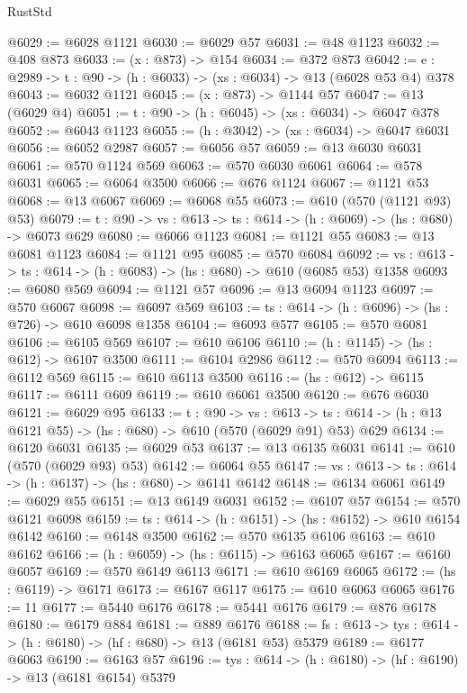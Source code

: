 \begin{lexlean}{RustStd}
\begin{coremodule}
@6029 := @6028 @1121
@6030 := @6029 @57
@6031 := @48 @1123
@6032 := @408 @873
@6033 := (x : @873) -> @154
@6034 := @372 @873
@6042 := {e : @2989} -> {t : @90} -> (h : @6033) -> (xs : @6034) -> @13 (@6028 @53 @4) @378
@6043 := @6032 @1121
@6045 := (x : @873) -> @1144 @57
@6047 := @13 (@6029 @4)
@6051 := {t : @90} -> (h : @6045) -> (xs : @6034) -> @6047 @378
@6052 := @6043 @1123
@6055 := (h : @3042) -> (xs : @6034) -> @6047 @6031
@6056 := @6052 @2987
@6057 := @6056 @57
@6059 := @13 @6030 @6031
@6061 := @570 @1124 @569
@6063 := @570 @6030 @6061
@6064 := @578 @6031
@6065 := @6064 @3500
@6066 := @676 @1124
@6067 := @1121 @53
@6068 := @13 @6067
@6069 := @6068 @55
@6073 := @610 (@570 (@1121 @93) @53)
@6079 := {t : @90} -> {vs : @613} -> {ts : @614} -> (h : @6069) -> (hs : @680) -> @6073 @629
@6080 := @6066 @1123
@6081 := @1121 @55
@6083 := @13 @6081 @1123
@6084 := @1121 @95
@6085 := @570 @6084
@6092 := {vs : @613} -> {ts : @614} -> (h : @6083) -> (hs : @680) -> @610 (@6085 @53) @1358
@6093 := @6080 @569
@6094 := @1121 @57
@6096 := @13 @6094 @1123
@6097 := @570 @6067
@6098 := @6097 @569
@6103 := {ts : @614} -> (h : @6096) -> (hs : @726) -> @610 @6098 @1358
@6104 := @6093 @577
@6105 := @570 @6081
@6106 := @6105 @569
@6107 := @610 @6106
@6110 := (h : @1145) -> (hs : @612) -> @6107 @3500
@6111 := @6104 @2986
@6112 := @570 @6094
@6113 := @6112 @569
@6115 := @610 @6113 @3500
@6116 := (hs : @612) -> @6115
@6117 := @6111 @609
@6119 := @610 @6061 @3500
@6120 := @676 @6030
@6121 := @6029 @95
@6133 := {t : @90} ->
  {vs : @613} ->
  {ts : @614} -> (h : @13 @6121 @55) -> (hs : @680) -> @610 (@570 (@6029 @91) @53) @629
@6134 := @6120 @6031
@6135 := @6029 @53
@6137 := @13 @6135 @6031
@6141 := @610 (@570 (@6029 @93) @53)
@6142 := @6064 @55
@6147 := {vs : @613} -> {ts : @614} -> (h : @6137) -> (hs : @680) -> @6141 @6142
@6148 := @6134 @6061
@6149 := @6029 @55
@6151 := @13 @6149 @6031
@6152 := @6107 @57
@6154 := @570 @6121 @6098
@6159 := {ts : @614} -> (h : @6151) -> (hs : @6152) -> @610 @6154 @6142
@6160 := @6148 @3500
@6162 := @570 @6135 @6106
@6163 := @610 @6162
@6166 := (h : @6059) -> (hs : @6115) -> @6163 @6065
@6167 := @6160 @6057
@6169 := @570 @6149 @6113
@6171 := @610 @6169 @6065
@6172 := (hs : @6119) -> @6171
@6173 := @6167 @6117
@6175 := @610 @6063 @6065
@6176 := 11
@6177 := @5440 @6176
@6178 := @5441 @6176
@6179 := @876 @6178
@6180 := @6179 @884
@6181 := @889 @6176
@6188 := {fs : @613} -> {tys : @614} -> (h : @6180) -> (hf : @680) -> @13 (@6181 @53) @5379
@6189 := @6177 @6063
@6190 := @6163 @57
@6196 := {tys : @614} -> (h : @6180) -> (hf : @6190) -> @13 (@6181 @6154) @5379

\end{coremodule}
\end{lexlean}

